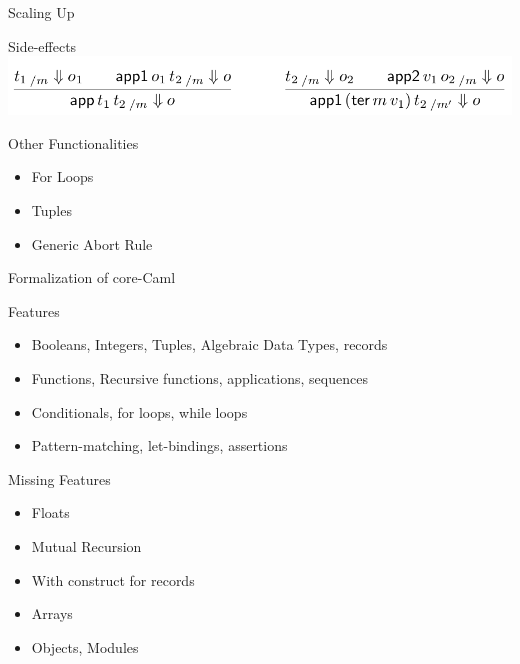 \documentclass[page number,dvipsnames]{beamer}
\begin{document}
\begin{frame}{Scaling Up}
  \begin{block}{Side-effects}
    \center
    \includegraphics[scale=0.3]{side_effect.png}
  \end{block}
  \vfill
  \begin{block}{Other Functionalities}
    \begin{itemize}
    \item For Loops
    \item Tuples
    \item Generic Abort Rule
    \end{itemize}
  \end{block}

\end{frame}

\begin{frame}{Formalization of core-Caml}
  \begin{exampleblock}{Features}
    \begin{itemize}
    \item Booleans, Integers, Tuples, Algebraic Data Types, records
    \item Functions, Recursive functions, applications, sequences
    \item Conditionals, for loops, while loops
    \item Pattern-matching, let-bindings, assertions
    \end{itemize}
  \end{exampleblock}
  \vfill
  \begin{alertblock}{Missing Features}
    \begin{itemize}
    \item Floats
    \item Mutual Recursion
    \item With construct for records
    \item Arrays
    \item Objects, Modules
    \end{itemize}
  \end{alertblock}

\end{frame}
\end{document}
